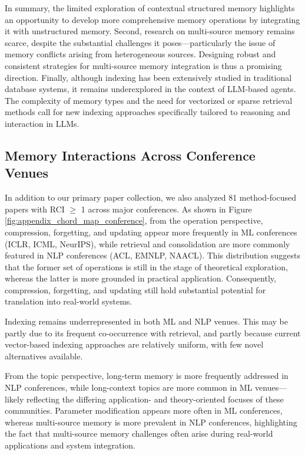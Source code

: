\documentclass[manuscript,screen]{acmart}
\begin{document}
In summary, the limited exploration of contextual structured memory highlights an opportunity to develop more comprehensive memory operations by integrating it with unstructured memory. Second, research on multi-source memory remains scarce, despite the substantial challenges it poses—particularly the issue of memory conflicts arising from heterogeneous sources. Designing robust and consistent strategies for multi-source memory integration is thus a promising direction. Finally, although indexing has been extensively studied in traditional database systems, it remains underexplored in the context of LLM-based agents. The complexity of memory types and the need for vectorized or sparse retrieval methods call for new indexing approaches specifically tailored to reasoning and interaction in LLMs.

\subsection{Memory Interactions Across Conference Venues}
In addition to our primary paper collection, we also analyzed 81 method-focused papers with RCI $\geq$ 1 across major conferences. As shown in Figure \ref{fig:appendix_chord_map_conference}, from the operation perspective, compression, forgetting, and updating appear more frequently in ML conferences (ICLR, ICML, NeurIPS), while retrieval and consolidation are more commonly featured in NLP conferences (ACL, EMNLP, NAACL). This distribution suggests that the former set of operations is still in the stage of theoretical exploration, whereas the latter is more grounded in practical application. Consequently, compression, forgetting, and updating still hold substantial potential for translation into real-world systems.

Indexing remains underrepresented in both ML and NLP venues. This may be partly due to its frequent co-occurrence with retrieval, and partly because current vector-based indexing approaches are relatively uniform, with few novel alternatives available.

From the topic perspective, long-term memory is more frequently addressed in NLP conferences, while long-context topics are more common in ML venues—likely reflecting the differing application- and theory-oriented focuses of these communities. Parameter modification appears more often in ML conferences, whereas multi-source memory is more prevalent in NLP conferences, highlighting the fact that multi-source memory challenges often arise during real-world applications and system integration.
\end{document}
